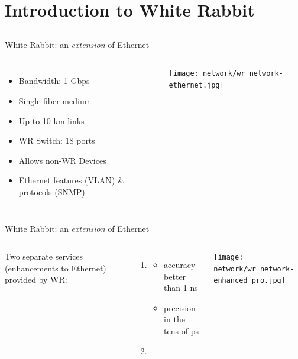 \documentclass[compress, red]{beamer}
\begin{document}
\section[WR Intro]{Introduction to White Rabbit}
\subsection{}

\begin{frame}{White Rabbit: an \emph{extension} of Ethernet}

\begin{columns}[c]
 

  \begin{itemize}
    \item Bandwidth: 1 Gbps
    \item Single fiber medium
    \item Up to 10 km links
    \item WR Switch: 18 ports
    \item Allows non-WR Devices
    \item Ethernet features (VLAN) \& protocols (SNMP)
  \end{itemize}

    \begin{center}
    \texttt{[image: network/wr\_network-ethernet.jpg]}
    \end{center}
\end{columns}

\end{frame}

\begin{frame}{White Rabbit: an \emph{extension} of Ethernet}


\begin{columns}[c]
 
  Two separate services (enhancements to Ethernet) provided by WR:
\begin{enumerate}
\item \color{blue!90}{Synchronization:}
  \begin{itemize}
    \item accuracy\\ better than 1 ns
    \item precision in the tens of ps
\end{itemize}
\item \color{red}{Deterministic, reliable and low-latency Control Data delivery}
\end{enumerate}

    \begin{center}
    \texttt{[image: network/wr\_network-enhanced\_pro.jpg]}
    \end{center}
\end{columns}

\end{frame}
\end{document}

